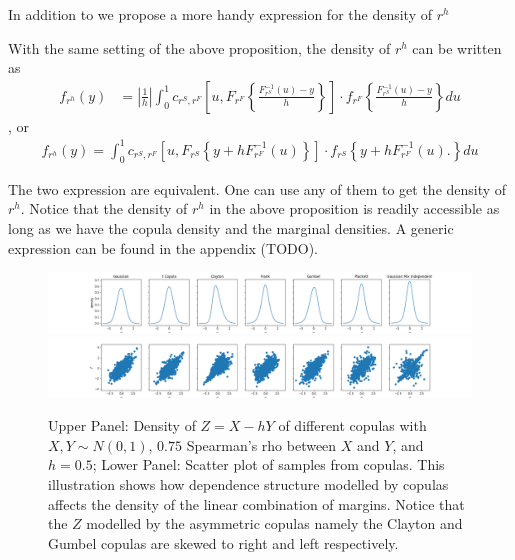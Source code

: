 \documentclass[11pt,a4paper,english]{article}
\begin{document}
In addition to \cite{Barbi2014} we propose a more handy expression for the density of $r^h$

\begin{proposition} With the same setting of the above proposition, the density of $r^h$ can be written as
  \begin{align}
  f_{r^h}(y) &= \left|\frac{1}{h}\right|\int_0^1 c_{r^S, r^F} \left[u,
  F_{r^F}\left\{\frac{F^{-1}_{r^S}(u)-y}{h}\right\}
  \right]
   \cdot
  f_{r^F}
  \left\{\frac{F^{-1}_{r^S}(u)-y}{h}\right\} du \label{eq:density1}
  \end{align}, or
    \begin{align}
      f_{r^h}(y)
      = \int_0^1 c_{r^S, r^F} \left[u,
      F_{r^S}\left\{y + h F^{-1}_{r^F}(u)\right\}
      \right]
       \cdot
      f_{r^S}
      \left\{
      y+ hF^{-1}_{r^F}(u).
      \right\} du\label{eq:density2}
  \end{align}
  \end{proposition}
The two expression are equivalent.
One can use any of them to get the density of $r^h$.
Notice that the density of $r^h$ in the above proposition is readily accessible as long as we have
the copula density and the marginal densities.
A generic expression can be found in the appendix (TODO).
\begin{figure}[h]
\includegraphics[width=\textwidth]{_pics/density illustration1.png}
\includegraphics[width=\textwidth]{_pics/density illustration2.png}
  \caption{Upper Panel: Density of $Z= X - hY$ of different copulas with
  $X, Y \sim N(0,1)$,
  $0.75$ Spearman's rho between $X$ and $Y$, and $h=0.5$;
  Lower Panel: Scatter plot of samples from copulas.
  This illustration shows how dependence structure modelled by copulas affects the density of the linear combination
  of margins.
  Notice that the $Z$ modelled by the asymmetric copulas namely the Clayton and Gumbel copulas are skewed to right
  and left respectively.}
\label{fig:density illustration}
\end{figure}
\end{document}
